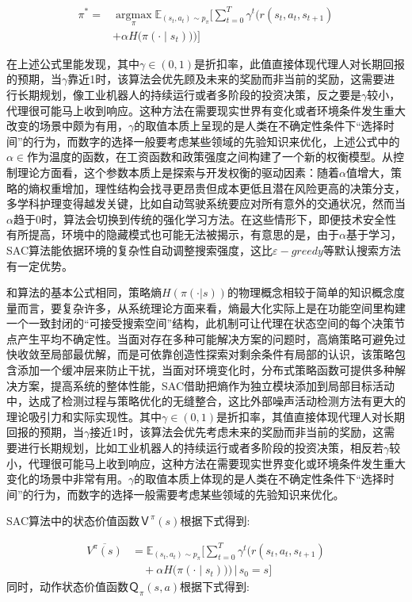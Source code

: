 \begin{align}
	\pi^* =& \operatorname*{argmax}_{\pi} \mathbb{E}_{(s_t, a_t) \sim p_{\pi}} \Bigg[ \sum_{t=0}^T \gamma^t \bigg( r(s_t, a_t, s_{t+1}) \\
	&+ \alpha H\big(\pi({\cdot} \mid s_t)\big) \bigg) \Bigg]
\end{align}

在上述公式里能发现，其中$γ∈(0,1)$是折扣率，此值直接体现代理人对长期回报的预期，当$γ$靠近1时，该算法会优先顾及未来的奖励而非当前的奖励，这需要进行长期规划，像工业机器人的持续运行或者多阶段的投资决策，反之要是$γ$较小，代理很可能马上收到响应。这种方法在需要现实世界有变化或者环境条件发生重大改变的场景中颇为有用，$γ$的取值本质上呈现的是人类在不确定性条件下“选择时间”的行为，而数字的选择一般要考虑某些领域的先验知识来优化，上述公式中的$α∈$作为温度的函数，在工资函数和政策强度之间构建了一个新的权衡模型。从控制理论方面看，这个参数本质上是探索与开发权衡的驱动因素：随着$α$值增大，策略的熵权重增加，理性结构会找寻更昂贵但成本更低且潜在风险更高的决策分支，多学科护理变得越发关键，比如自动驾驶系统要应对所有意外的交通状况，然而当$α$趋于0时，算法会切换到传统的强化学习方法。在这些情形下，即便技术安全性有所提高，环境中的隐藏模式也可能无法被揭示，有意思的是，由于$α$基于学习，SAC算法能依据环境的复杂性自动调整搜索强度，这比$ε-greedy$等默认搜索方法有一定优势。

和算法的基本公式相同，策略熵$H(π(·|s))$的物理概念相较于简单的知识概念度量而言，要复杂许多，从系统理论方面来看，熵最大化实际上是在功能空间里构建一个一致封闭的“可接受搜索空间”结构，此机制可让代理在状态空间的每个决策节点产生平均不确定性。当面对存在多种可能解决方案的问题时，高熵策略可避免过快收敛至局部最优解，而是可依靠创造性探索对剩余条件有局部的认识，该策略包含添加一个缓冲层来防止干扰，当面对环境变化时，分布式策略函数可提供多种解决方案，提高系统的整体性能，SAC借助把熵作为独立模块添加到局部目标活动中，达成了检测过程与策略优化的无缝整合，这比外部噪声活动检测方法有更大的理论吸引力和实际实现性。其中$γ∈(0,1)$是折扣率，其值直接体现代理人对长期回报的预期，当$γ$接近1时，该算法会优先考虑未来的奖励而非当前的奖励，这需要进行长期规划，比如工业机器人的持续运行或者多阶段的投资决策，相反若$γ$较小，代理很可能马上收到响应，这种方法在需要现实世界变化或环境条件发生重大变化的场景中非常有用。$γ$的取值本质上体现的是人类在不确定性条件下“选择时间”的行为，而数字的选择一般需要考虑某些领域的先验知识来优化。

SAC算法中的状态价值函数$Ｖ^π(s)$根据下式得到:

\begin{align}
	\overline{V^{\pi}(s)} 
	&= \mathbb{E}_{(s_t, a_t) \sim p_{\pi}} \Bigg[ \sum_{t=0}^{T} \gamma^t \bigg( r(s_t, a_t, s_{t+1}) \\
	&\quad + \alpha H\big(\pi({\cdot} \mid s_t)\big) \bigg) \,\bigg|\, s_0 = s \Bigg]
\end{align}
同时，动作状态价值函数$Ｑ_π(s,a)$根据下式得到:

